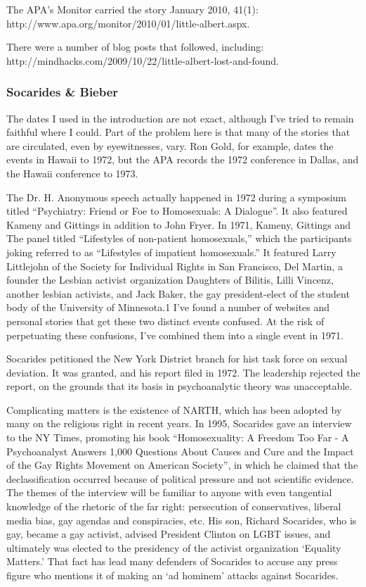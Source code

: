 The APA's Monitor carried the story January 2010, 41(1): http:\slash \slash www.apa.org\slash monitor\slash 2010\slash 01\slash little-albert.aspx.

There were a number of blog posts that followed, including: http:\slash \slash mindhacks.com\slash 2009\slash 10\slash 22\slash little-albert-lost-and-found. 

\subsubsection{Socarides \& Bieber}
\label{socaridesbieber}

The dates I used in the introduction are not exact, although I've tried to remain faithful where I could. Part of the problem here is that many of the stories that are circulated, even by eyewitnesses, vary. Ron Gold, for example, dates the events in Hawaii to 1972, but the APA records the 1972 conference in Dallas, and the Hawaii conference to 1973. 

The Dr. H. Anonymous speech actually happened in 1972 during a symposium titled “Psychiatry: Friend or Foe to Homosexuals: A Dialogue”. It also featured Kameny and Gittings in addition to John Fryer. In 1971, Kameny, Gittings and The panel titled “Lifestyles of non-patient homosexuals,” which the participants joking referred to as “Lifestyles of impatient homosexuals.” It featured Larry Littlejohn of the Society for Individual Rights in San Francisco, Del Martin, a founder the Lesbian activist organization Daughters of Bilitis, Lilli Vincenz, another lesbian activists, and Jack Baker, the gay president-elect of the student body of the University of Minnesota.1 I've found a number of websites and personal stories that get these two distinct events confused. At the risk of perpetuating these confusions, I've combined them into a single event in 1971.

Socarides petitioned the New York District branch for hist task force on sexual deviation. It was granted, and his report filed in 1972. The leadership rejected the report, on the grounds that its basis in psychoanalytic theory was unacceptable. 

Complicating matters is the existence of NARTH, which has been adopted by many on the religious right in recent years. In 1995, Socarides gave an interview to the NY Times, promoting his book “Homosexuality: A Freedom Too Far - A Psychoanalyst Answers 1,000 Questions About Causes and Cure and the Impact of the Gay Rights Movement on American Society”, in which he claimed that the declassification occurred because of political pressure and not scientific evidence. The themes of the interview will be familiar to anyone with even tangential knowledge of the rhetoric of the far right: persecution of conservatives, liberal media bias, gay agendas and conspiracies, etc. His son, Richard Socarides, who is gay, became a gay activist, advised President Clinton on LGBT issues, and ultimately was elected to the presidency of the activist organization `Equality Matters.' That fact has lead many defenders of Socarides to accuse any press figure who mentions it of making an `ad hominem' attacks against Socarides. 


